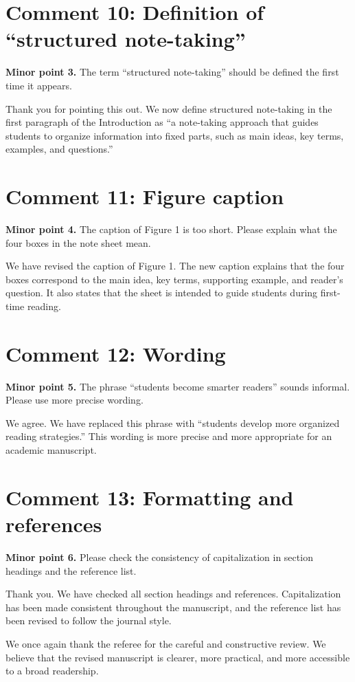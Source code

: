 \section*{Comment 10: Definition of ``structured note-taking''}
\begin{commentbox}
\textbf{Minor point 3.} The term ``structured note-taking'' should be defined the first time it appears.
\end{commentbox}
\begin{replybox}
Thank you for pointing this out. We now define structured note-taking in the first paragraph of the Introduction as ``a note-taking approach that guides students to organize information into fixed parts, such as main ideas, key terms, examples, and questions.''
\end{replybox}
\section*{Comment 11: Figure caption}
\begin{commentbox}
\textbf{Minor point 4.} The caption of Figure 1 is too short. Please explain what the four boxes in the note sheet mean.
\end{commentbox}
\begin{replybox}
We have revised the caption of Figure 1. The new caption explains that the four boxes correspond to the main idea, key terms, supporting example, and reader's question. It also states that the sheet is intended to guide students during first-time reading.
\end{replybox}
\section*{Comment 12: Wording}
\begin{commentbox}
\textbf{Minor point 5.} The phrase ``students become smarter readers'' sounds informal. Please use more precise wording.
\end{commentbox}
\begin{replybox}
We agree. We have replaced this phrase with ``students develop more organized reading strategies.'' This wording is more precise and more appropriate for an academic manuscript.
\end{replybox}
\section*{Comment 13: Formatting and references}
\begin{commentbox}
\textbf{Minor point 6.} Please check the consistency of capitalization in section headings and the reference list.
\end{commentbox}
\begin{replybox}
Thank you. We have checked all section headings and references. Capitalization has been made consistent throughout the manuscript, and the reference list has been revised to follow the journal style.
\end{replybox}
\vspace{1em}
We once again thank the referee for the careful and constructive review. We believe that the revised manuscript is clearer, more practical, and more accessible to a broad readership.
